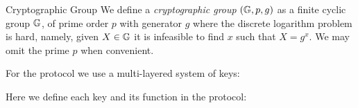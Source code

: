\begin{definitiontoc}{Cryptographic Group}
    We define a \emph{cryptographic group} $({\mathbb{G}}, p, g)$ as a finite cyclic group ${\mathbb{G}}$, of prime order $p$ with generator $g$ where the discrete logarithm problem is hard, namely, given $X \in {\mathbb{G}}$ it is infeasible to find $x$ such that $X = g^x$. We may omit the prime $p$ when convenient.
\end{definitiontoc}


For the \Transfer{} protocol we use a multi-layered system of keys:

\begin{center}
    \vspace{1em}
    \begin{mdframed}[leftmargin=0.125\textwidth, rightmargin=0.125\textwidth]
        \begin{center}
        \end{center}
    \end{mdframed}
    \vspace{-1em}
\end{center}

Here we define each key and its function in the \Transfer{} protocol:

